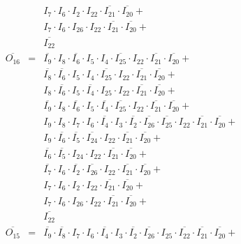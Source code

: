 \documentclass[a4paper,russian]{report}
\begin{document}
\begin{eqnarray*}
	& &  I_{7} \cdotp I_{6} \cdotp I_{2} \cdotp I_{22} \cdotp \overline{I_{21}} \cdotp \overline{I_{20}} + \\
	& &  I_{7} \cdotp I_{6} \cdotp I_{26} \cdotp I_{22} \cdotp \overline{I_{21}} \cdotp \overline{I_{20}} + \\
	& &  \overline{I_{22}} \\
    \overline{O_{16}} & = & \overline{I_{9}} \cdotp I_{8} \cdotp \overline{I_{6}} \cdotp I_{5} \cdotp I_{4} \cdotp \overline{I_{25}} \cdotp I_{22} \cdotp \overline{I_{21}} \cdotp \overline{I_{20}} + \\
	& &  \overline{I_{8}} \cdotp \overline{I_{6}} \cdotp I_{5} \cdotp I_{4} \cdotp \overline{I_{25}} \cdotp I_{22} \cdotp \overline{I_{21}} \cdotp \overline{I_{20}} + \\
	& &  I_{8} \cdotp \overline{I_{6}} \cdotp I_{5} \cdotp \overline{I_{4}} \cdotp I_{25} \cdotp I_{22} \cdotp \overline{I_{21}} \cdotp \overline{I_{20}} + \\
	& &  \overline{I_{9}} \cdotp I_{8} \cdotp \overline{I_{6}} \cdotp I_{5} \cdotp \overline{I_{4}} \cdotp \overline{I_{25}} \cdotp I_{22} \cdotp \overline{I_{21}} \cdotp \overline{I_{20}} + \\
	& &  I_{9} \cdotp I_{8} \cdotp I_{7} \cdotp I_{6} \cdotp \overline{I_{4}} \cdotp I_{3} \cdotp \overline{I_{2}} \cdotp \overline{I_{26}} \cdotp \overline{I_{25}} \cdotp I_{22} \cdotp \overline{I_{21}} \cdotp \overline{I_{20}} + \\
	& &  I_{9} \cdotp \overline{I_{6}} \cdotp \overline{I_{5}} \cdotp \overline{I_{24}} \cdotp I_{22} \cdotp \overline{I_{21}} \cdotp \overline{I_{20}} + \\
	& &  \overline{I_{6}} \cdotp \overline{I_{5}} \cdotp I_{24} \cdotp I_{22} \cdotp \overline{I_{21}} \cdotp \overline{I_{20}} + \\
	& &  \overline{I_{7}} \cdotp I_{6} \cdotp \overline{I_{2}} \cdotp \overline{I_{26}} \cdotp I_{22} \cdotp \overline{I_{21}} \cdotp \overline{I_{20}} + \\
	& &  I_{7} \cdotp I_{6} \cdotp I_{2} \cdotp I_{22} \cdotp \overline{I_{21}} \cdotp \overline{I_{20}} + \\
	& &  I_{7} \cdotp I_{6} \cdotp I_{26} \cdotp I_{22} \cdotp \overline{I_{21}} \cdotp \overline{I_{20}} + \\
	& &  \overline{I_{22}} \\
    \overline{O_{15}} & = & \overline{I_{9}} \cdotp \overline{I_{8}} \cdotp I_{7} \cdotp I_{6} \cdotp \overline{I_{4}} \cdotp I_{3} \cdotp \overline{I_{2}} \cdotp \overline{I_{26}} \cdotp I_{25} \cdotp \overline{I_{22}} \cdotp \overline{I_{21}} \cdotp \overline{I_{20}} + \\

\end{eqnarray*}
\end{document}

